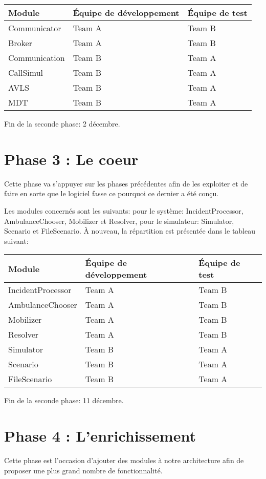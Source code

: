 \noindent\begin{tabularx}{\textwidth}{|l|l|X|}
\hline
Module			& 	Équipe de développement & Équipe de test\\
\hline
Communicator	&	Team A 	&	Team B \\
Broker			&	Team A	&	Team B \\
Communication 	&	Team B	&	Team A	\\
CallSimul		&	Team B	&	Team A	\\
AVLS			&	Team B	&	Team A	\\
MDT				&	Team B	&	Team A	\\
\hline
\end{tabularx}

Fin de la seconde phase: 2 décembre.

\section{Phase 3 : Le coeur}
Cette phase va s'appuyer sur les phases précédentes afin de les exploiter
et de faire en sorte que le logiciel fasse ce pourquoi ce dernier a été conçu.

Les modules concernés sont les suivants: pour le système: IncidentProcessor,
AmbulanceChooser, Mobilizer et Resolver, pour le simulateur: Simulator,
Scenario et FileScenario.
À nouveau, la répartition est présentée dans le tableau suivant:

\noindent\begin{tabularx}{\textwidth}{|l|l|X|}
\hline
Module			& 	Équipe de développement & Équipe de test\\
\hline
IncidentProcessor	&	Team A 	&	Team B \\
AmbulanceChooser	&	Team A	&	Team B \\
Mobilizer 			&	Team A	&	Team B \\
Resolver			&	Team A	&	Team B \\
Simulator			&	Team B	&	Team A \\
Scenario			&	Team B	&	Team A \\
FileScenario		&	Team B	&	Team A \\
\hline
\end{tabularx}

Fin de la seconde phase: 11 décembre.

\section{Phase 4 : L'enrichissement}
Cette phase est l'occasion d'ajouter des modules à notre architecture afin de 
proposer une plus grand nombre de fonctionnalité.

